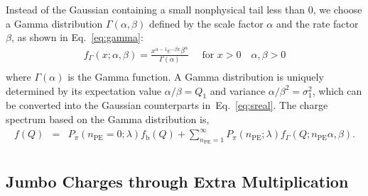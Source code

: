 Instead of the Gaussian containing a small nonphysical tail less than 0,
we choose a Gamma distribution $\varGamma(\alpha, \beta)$
defined by the scale factor $\alpha$ and the rate factor $\beta$, as shown in Eq.~\eqref{eq:gamma}:
\begin{equation}
	\label{eq:gamma}
	\begin{aligned}
		f_\Gamma(x ; \alpha, \beta) = \frac{x^{\alpha-1} e^{-\beta x} \beta^\alpha}{\Gamma(\alpha)} \quad \text { for } x>0 \quad \alpha, \beta>0 \\
	\end{aligned}
\end{equation}
where $\Gamma(\alpha)$ is the Gamma function.
A Gamma distribution is uniquely determined by its expectation value \(\alpha/\beta=Q_1\) and variance \(\alpha/\beta^2=\sigma_1^2\),
which can be converted into the Gaussian counterparts in~Eq.~\eqref{eq:sreal}.
The charge spectrum based on the Gamma distribution is,
\begin{equation}
	\begin{aligned}
		f(Q) & = & P_{\pi}(n_{\mathrm{PE}}=0;\lambda)f_{\mathrm{b}}(Q) + \sum_{n_{\mathrm{PE}}=1}^{\infty}P_\pi(n_{\mathrm{PE}};\lambda) f_\Gamma(Q;n_{\mathrm{PE}}\alpha, \beta). \\
	\end{aligned}
	\label{eq:Gamma}
\end{equation}

\subsection{Jumbo Charges through Extra Multiplication}\label{sec:see}

